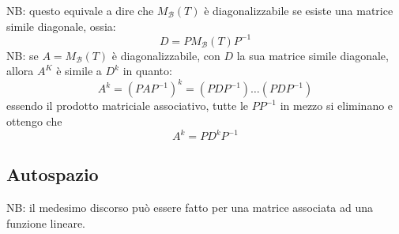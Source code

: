 \documentclass[12pt,a4paper,oneside]{article}
\begin{document}
NB: questo equivale a dire che $ M_{ \mathcal{B}}(T) $ è diagonalizzabile se esiste una matrice simile diagonale, ossia:
\[
	D = P M_{ \mathcal{B}}\left( T \right) P^{-1}
\]
NB: se $ A = M_{ \mathcal{B}}\left( T \right) $ è diagonalizzabile, con $ D $ la sua matrice simile diagonale, allora $ A^{K} $ è simile a $ D^{k} $ in quanto:
\[
	A^{k}= \left( P A P^{-1} \right) ^{k} = \left( P D P^{-1} \right)\ldots \left( P D P^{-1} \right)
\]
essendo il prodotto matriciale associativo, tutte le $ PP^{-1} $ in mezzo si eliminano e ottengo che
\[
	A^{k}= P D^{k}P^{-1}
\]
\subsection{Autospazio}
NB: il medesimo discorso può essere fatto per una matrice associata ad una funzione lineare.
\end{document}
